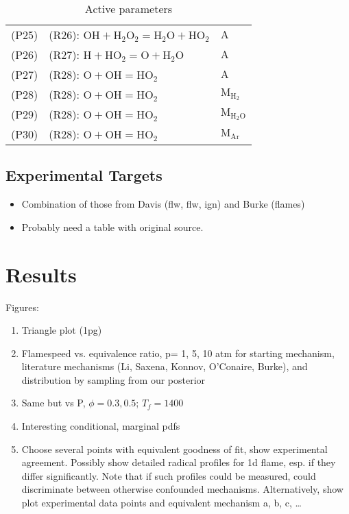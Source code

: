 \documentclass[preprint,3p,times,twocolumn]{elsarticle}
\begin{document}
\begin{itemize}
\begin{table}[htp]
\begin{tabular}{l l l}
(P25)& (R26): $ \mathrm{OH} + \mathrm{H}_2\mathrm{O}_2 = \mathrm{H}_2\mathrm{O} + \mathrm{HO}_2     $&$ \mathrm{A}$\\
(P26)& (R27): $ \mathrm{H} + \mathrm{HO}_2 = \mathrm{O} + \mathrm{H}_2\mathrm{O}     $&$ \mathrm{A}$\\
(P27)& (R28): $ \mathrm{O} + \mathrm{OH} = \mathrm{HO}_2     $&$ \mathrm{A}$\\
(P28)& (R28): $ \mathrm{O} + \mathrm{OH} = \mathrm{HO}_2     $&$ \mathrm{M}_{\mathrm{H}_2}$\\
(P29)& (R28): $ \mathrm{O} + \mathrm{OH} = \mathrm{HO}_2     $&$ \mathrm{M}_{\mathrm{H}_2\mathrm{O}}$\\
(P30)& (R28): $ \mathrm{O} + \mathrm{OH} = \mathrm{HO}_2     $&$ \mathrm{M}_{\mathrm{Ar}}$\\
\hline
\end{tabular}
    \caption{Active parameters}
    \label{tab:parameters}
  \end{table}
\end{itemize}
\subsection{Experimental Targets}
\begin{itemize}
\item Combination of those from Davis (flw, flw, ign) and Burke
  (flames)
\item Probably need a table with original source.
\end{itemize}
\section{Results}
Figures:
\begin{enumerate}
\item Triangle plot (1pg)
\item Flamespeed vs. equivalence ratio, p= 1, 5, 10 atm for starting
  mechanism, literature mechanisms (Li, Saxena, Konnov, O'Conaire,
  Burke), and distribution by sampling from our posterior
\item Same but vs P, $\phi=0.3,0.5$; $T_f=1400$
    \item Interesting conditional, marginal pdfs
    \item Choose several points with equivalent goodness of fit, show
      experimental agreement. Possibly show detailed radical profiles
      for 1d flame, esp. if they differ significantly. Note that if
      such profiles could be measured, could discriminate between
      otherwise confounded mechanisms. Alternatively, show plot
      experimental data points and equivalent mechanism a, b, c,
      \ldots
 \end{enumerate}
 
\end{document}
